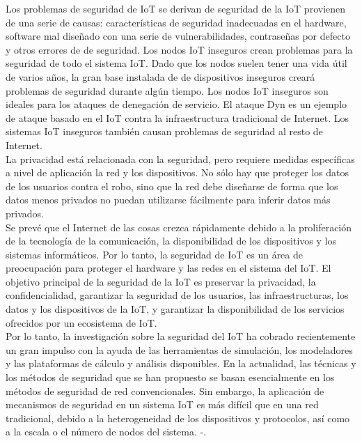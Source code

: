 {Los problemas de seguridad de IoT se derivan de seguridad de la IoT provienen de una serie de causas: características de seguridad inadecuadas en el hardware, software mal diseñado con una serie de vulnerabilidades, contraseñas por defecto y otros errores de de seguridad. Los nodos IoT inseguros crean problemas para la seguridad de todo el sistema IoT. Dado que los nodos suelen tener una vida útil de varios años, la gran base instalada de de dispositivos inseguros creará problemas de seguridad durante algún tiempo. Los nodos IoT inseguros son ideales para los ataques de denegación de servicio. El ataque Dyn es un ejemplo de ataque basado en el IoT contra la infraestructura tradicional de Internet. Los sistemas IoT inseguros también causan problemas de seguridad al resto de Internet. \\

La privacidad está relacionada con la seguridad, pero requiere medidas específicas a nivel de aplicación la red y los dispositivos. No sólo hay que proteger los datos de los usuarios contra el robo, sino que la red debe diseñarse de forma que los datos menos privados no puedan utilizarse fácilmente para inferir datos más privados. \cite{serpanos2018internet} \\ 

Se prevé que el Internet de las cosas crezca rápidamente debido a la proliferación de la tecnología de la comunicación, la disponibilidad de los dispositivos y los sistemas informáticos. Por lo tanto, la seguridad de IoT es un área de preocupación para proteger el hardware y las redes en el sistema del IoT. El objetivo principal de la seguridad de la IoT es preservar la privacidad, la confidencialidad, garantizar la seguridad de los usuarios, las infraestructuras, los datos y los dispositivos de la IoT, y garantizar la disponibilidad de los servicios ofrecidos por un ecosistema de IoT. \\

Por lo tanto, la investigación sobre la seguridad del IoT ha cobrado recientemente un gran impulso con la ayuda de las herramientas de simulación, los modeladores y las plataformas de cálculo y análisis disponibles. En la actualidad, las técnicas y los métodos de seguridad que se han propuesto se basan esencialmente en los métodos de seguridad de red convencionales. Sin embargo, la aplicación de mecanismos de seguridad en un sistema IoT es más difícil que en una red tradicional, debido a la heterogeneidad de los dispositivos y protocolos, así como a la escala o el número de nodos del sistema. \cite{lin2017survey}-\cite{hassan2019current}.

}
